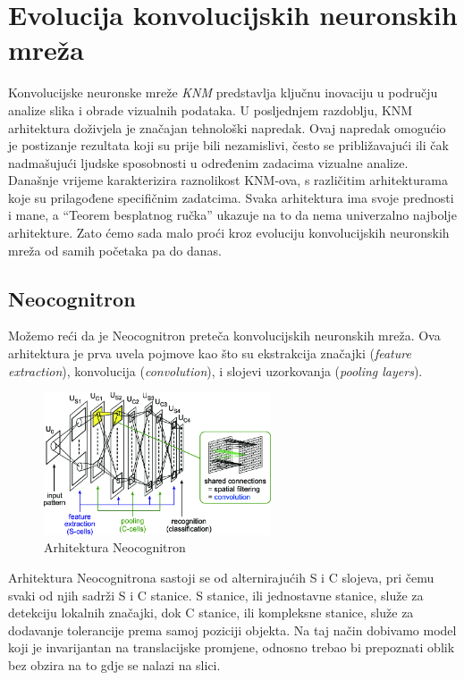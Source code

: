 
\chapter{Evolucija konvolucijskih neuronskih mreža}\label{ch:evolucija-konvolucijskih-neuronskih-mreza}
Konvolucijske neuronske mreže \emph{KNM} predstavlja ključnu inovaciju u području analize slika i obrade vizualnih podataka.
U posljednjem razdoblju, KNM arhitektura doživjela je značajan tehnološki napredak.
Ovaj napredak omogućio je postizanje rezultata koji su prije bili nezamislivi, često se približavajući ili čak nadmašujući ljudske sposobnosti u određenim zadacima vizualne analize.
Današnje vrijeme karakterizira raznolikost KNM-ova, s različitim arhitekturama koje su prilagođene specifičnim zadatcima.
Svaka arhitektura ima svoje prednosti i mane, a \enquote{Teorem besplatnog ručka} ukazuje na to da nema univerzalno najbolje arhitekture.
Zato ćemo sada malo proći kroz evoluciju konvolucijskih neuronskih mreža od samih početaka pa do danas.

\section{Neocognitron}\label{sec:neocognitron}
Možemo reći da je Neocognitron preteča konvolucijskih neuronskih mreža.
Ova arhitektura je prva uvela pojmove kao što su ekstrakcija značajki (\emph{feature extraction}), konvolucija (\emph{convolution}), i slojevi uzorkovanja (\emph{pooling layers}).
\FloatBarrier
\begin{figure}[h]
    \centering
    \includegraphics[width=0.6\textwidth]{images/Neocognitron}
    \caption{Arhitektura Neocognitron
    \protect\footnotemark}
    \label{fig:slika7}
\end{figure}
\FloatBarrier
{}
Arhitektura Neocognitrona sastoji se od alternirajućih S i C slojeva, pri čemu svaki od njih sadrži S i C stanice.
S stanice, ili jednostavne stanice, služe za detekciju lokalnih značajki, dok C stanice, ili kompleksne stanice, služe za dodavanje tolerancije prema samoj poziciji objekta.
Na taj način dobivamo model koji je invarijantan na translacijske promjene, odnosno trebao bi prepoznati oblik bez obzira na to gdje se nalazi na slici.

